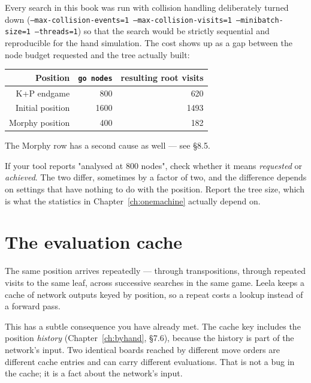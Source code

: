 \begin{realdata}[title={Real engine output: requested nodes versus tree size}]
Every search in this book was run with collision handling deliberately turned down
(\texttt{--max-collision-events=1 --max-collision-visits=1 --minibatch-size=1 --threads=1})
so that the search would be strictly sequential and reproducible for the hand simulation.
The cost shows up as a gap between the node budget requested and the tree actually built:
\begin{center}
\begin{tabular}{@{}rrr@{}}
\toprule
Position & \texttt{go nodes} & resulting root visits \\
\midrule
K+P endgame & 800  & 620 \\
Initial position & 1600 & 1493 \\
Morphy position & 400  & 182 \\
\bottomrule
\end{tabular}
\end{center}
The Morphy row has a second cause as well --- see §8.5.
\end{realdata}

\begin{pitfall}
If your tool reports "analysed at 800 nodes", check whether it means \emph{requested} or
\emph{achieved}. The two differ, sometimes by a factor of two, and the difference depends on
settings that have nothing to do with the position. Report the tree size, which is what the
statistics in Chapter~\ref{ch:onemachine} actually depend on.
\end{pitfall}

\section{The evaluation cache}

The same position arrives repeatedly --- through transpositions, through repeated visits to
the same leaf, across successive searches in the same game. Leela keeps a cache of network
outputs keyed by position, so a repeat costs a lookup instead of a forward pass.

This has a subtle consequence you have already met. The cache key includes the position
\emph{history} (Chapter~\ref{ch:byhand}, §7.6), because the history is part of the network's
input. Two identical boards reached by different move orders are different cache entries and
can carry different evaluations. That is not a bug in the cache; it is a fact about the
network's input.


